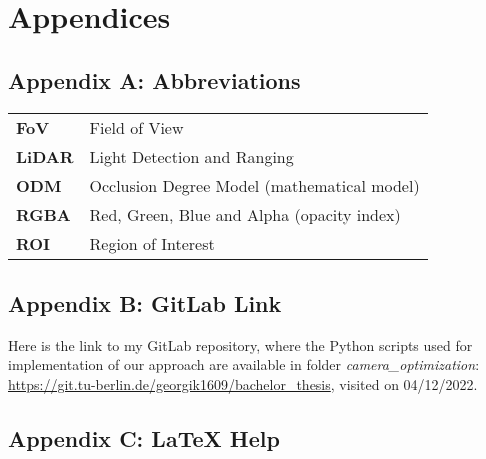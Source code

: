 \chapter*{Appendices}
\label{appendices}
{}
\section*{Appendix A: Abbreviations}
\begin{center}
\begin{tabular}{ll}
\textbf{FoV}	&	Field of View\\
\textbf{LiDAR}	&	Light Detection and Ranging\\
\textbf{ODM}	&	Occlusion Degree Model (mathematical model)\\
\textbf{RGBA}	&	Red, Green, Blue and Alpha (opacity index)\\
\textbf{ROI}	&	Region of Interest\\
\end{tabular}
\end{center}

\newpage
{}
\section*{Appendix B: GitLab Link}

Here is the link to my GitLab repository, where the Python scripts used for implementation of our approach are available in folder \textit{camera\_optimization}: \url{https://git.tu-berlin.de/georgik1609/bachelor_thesis}, visited on 04/12/2022.

\newpage
\section*{Appendix C: {\LaTeX} Help}


